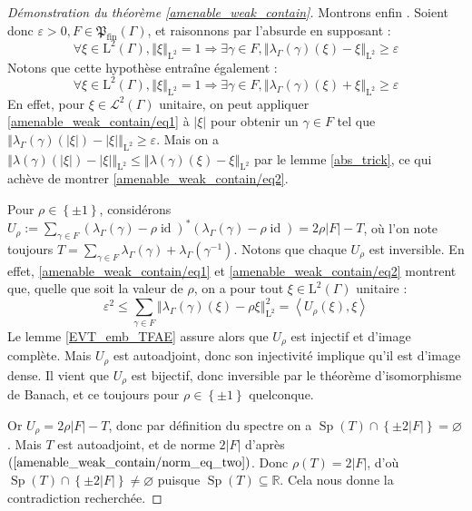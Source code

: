 \documentclass[a4paper,12pt]{article}
\newcommand{\R}{\mathbb{R}}
\newcommand{\norm}[1]{\left\Vert #1\right\Vert}
\newcommand{\abs}[1]{\left\vert#1\right\vert}
\newcommand{\card}[1]{\abs{#1}}
\newcommand{\ket}[1]{\left\langle #1 \right\rangle}
\newcommand{\set}[1]{\left\{ #1 \right\}}
\newcommand{\inv}{^{-1}}
\renewcommand{\implies}{\Rightarrow}
\newcommand{\finparts}{\mathfrak{P}_{\mathrm{fin}}}
\DeclareMathOperator{\id}{id}
\DeclareMathOperator{\Sp}{Sp}
\begin{document}
\begin{proof}[Démonstration du théorème \ref{amenable_weak_contain}]
    Montrons enfin \framebox{$(\ref{amenable_weak_contain/norm_eq_two})\implies(\ref{amenable_weak_contain/weak_almost_invariant})$}. Soient donc $\varepsilon>0, F\in\finparts(\Gamma)$, et 
    raisonnons par l'absurde en supposant :
    \begin{equation}\label{amenable_weak_contain/eq1}
        \forall\xi\in\mathrm{L}^2(\Gamma), \norm{\xi}_{\mathrm{L}^2} = 1\implies \exists\gamma\in F, \norm{\lambda_\Gamma(\gamma)(\xi) - \xi}_{\mathrm{L}^2}\geq\varepsilon
    \end{equation}
    Notons que cette hypothèse entraîne également :
    \begin{equation}\label{amenable_weak_contain/eq2}
        \forall\xi\in\mathrm{L}^2(\Gamma), \norm{\xi}_{\mathrm{L}^2} = 1\implies \exists\gamma\in F, \norm{\lambda_\Gamma(\gamma)(\xi) + \xi}_{\mathrm{L}^2}\geq\varepsilon
    \end{equation}
    En effet, pour $\xi\in\mathscr{L}^2(\Gamma)$ unitaire, on peut appliquer \eqref{amenable_weak_contain/eq1} à $\abs\xi$ pour obtenir un $\gamma\in F$ tel que $\norm{\lambda_\Gamma(\gamma)(\abs\xi) - \abs\xi}_{\mathrm{L}^2}\geq\varepsilon$.
    Mais on a $\norm{\lambda(\gamma)(\abs{\xi}) - \abs{\xi}}_{\mathrm{L}^2} \le \norm{\lambda(\gamma)(\xi) - \xi}_{\mathrm{L}^2}$ par le lemme \ref{abs_trick}, ce qui achève de montrer \eqref{amenable_weak_contain/eq2}.

    Pour $\rho\in\set{\pm1}$, considérons $U_\rho := \sum_{\gamma\in F}(\lambda_\Gamma(\gamma) - \rho\id)^*(\lambda_\Gamma(\gamma) - \rho\id) = 2\rho\card{F} - T$, 
    où l'on note toujours $T = \sum_{\gamma\in F}\lambda_\Gamma(\gamma) + \lambda_\Gamma(\gamma\inv)$. Notons que chaque $U_\rho$ est inversible. 
    En effet, \eqref{amenable_weak_contain/eq1} et \eqref{amenable_weak_contain/eq2} montrent que, quelle que soit la valeur de $\rho$, 
    on a pour tout $\xi\in\mathrm{L}^2(\Gamma)$ unitaire :
    \begin{equation*}
        \varepsilon^2\leq\sum_{\gamma\in F}\norm{\lambda_\Gamma(\gamma)(\xi) - \rho\xi}_{\mathrm{L}^2}^2 = \ket{U_\rho(\xi), \xi}
    \end{equation*}
    Le lemme \ref{EVT_emb_TFAE} assure alors que $U_\rho$ est injectif et d'image complète. Mais $U_\rho$ est autoadjoint, donc 
    son injectivité implique qu'il est d'image dense. Il vient que $U_\rho$ est bijectif, donc inversible par le théorème d'isomorphisme de Banach,
    et ce toujours pour $\rho\in\set{\pm1}$ quelconque.

    Or $U_\rho = 2\rho\card{F} - T$, donc par définition du spectre on a $\Sp(T)\cap\set{\pm2\card{F}}=\varnothing$. Mais $T$ est autoadjoint,
    et de norme $2\card{F}$ d'après $(\ref{amenable_weak_contain/norm_eq_two})$. Donc $\rho(T) = 2\card{F}$, d'où $\Sp(T)\cap\set{\pm2\card{F}}\neq\varnothing$
    puisque $\Sp(T)\subseteq\R$. Cela nous donne la contradiction recherchée.


\end{proof}
\end{document}
